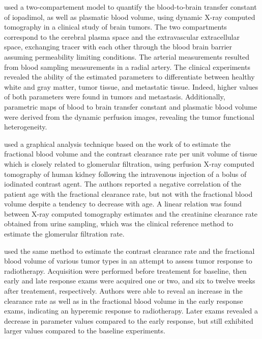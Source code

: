 \citet{Yeung:1992wy} used a two-compartement model to quantify the blood-to-brain transfer constant of iopadimol, as well as plasmatic blood volume, using dynamic X-ray computed tomography in a clinical study of brain tumors.
The two compartments correspond to the cerebral plasma space and the extravascular extracellular space, exchanging tracer with each other through the blood brain barrier assuming permeability limiting conditions.
The arterial measurements resulted from blood sampling measurements in a radial artery.
The clinical experiments revealed the ability of the estimated parameters to differentiate between healthy white and gray matter, tumor tissue, and metastatic tissue.
Indeed, higher values of both parameters were found in tumors and metastasis.
Additionally, parametric maps of blood to brain transfer constant and plasmatic blood volume were derived from the dynamic perfusion images, revealing the tumor functional heterogeneity.

\citet{Tsushima:1999ub} used a graphical analysis technique based on the work of \citet{Patlak:1983id} to estimate the fractional blood volume and the contrast clearance rate per unit volume of tissue which is closely related to glomerular filtration, using perfusion X-ray computed tomography of human kidney following the intravenous injection of a bolus of iodinated contrast agent. 
The authors reported a negative correlation of the patient age with the fractional clearance rate, but not with the fractional blood volume despite a tendency to decrease with age. 
A linear relation was found between X-ray computed tomography estimates and the creatinine clearance rate obtained from urine sampling, which was the clinical reference method to estimate the glomerular filtration rate.

\citet{Harvey:1999wa} used the same method to estimate the contrast clearance rate and the fractional blood volume of various tumor types in an attempt to assess tumor response to radiotherapy.
Acquisition were performed before treatement for baseline, then early and late response exams were acquired one or two, and six to twelve weeks after treatement, respectively.
Authors were able to reveal an increase in the clearance rate as well as in the fractional blood volume in the early response exams, indicating an hyperemic response to radiotherapy.
Later exams revealed a decrease in parameter values compared to the early response, but still exhibited larger values compared to the baseline experiments.


